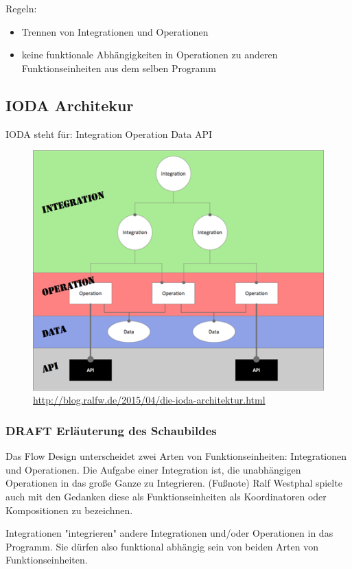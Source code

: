 \documentclass[11pt]{article}
\begin{document}
Regeln:
\begin{itemize}
\item Trennen von Integrationen und Operationen
\item keine funktionale Abhängigkeiten in Operationen zu anderen Funktionseinheiten aus dem selben Programm
\end{itemize}
\subsection{IODA Architekur}
\label{sec:orgheadline34}
IODA steht für: Integration Operation Data API
\begin{figure}[htb]
\centering
\includegraphics[width=.9\linewidth]{./img/ioda1.png}
\caption{\url{http://blog.ralfw.de/2015/04/die-ioda-architektur.html}}
\end{figure}

\subsubsection{{\bfseries\sffamily DRAFT} Erläuterung des Schaubildes}
\label{sec:orgheadline28}
Das Flow Design unterscheidet zwei Arten von Funktionseinheiten: Integrationen und Operationen.
Die Aufgabe einer Integration ist, die unabhängigen Operationen in das große Ganze zu
Integrieren. 
(Fußnote) Ralf Westphal spielte auch mit den Gedanken diese als Funktionseinheiten als Koordinatoren oder
Kompositionen zu bezeichnen.

Integrationen "integrieren" andere Integrationen und/oder Operationen in das Programm. Sie dürfen also funktional abhängig sein
von beiden Arten von Funktionseinheiten.
\end{document}
